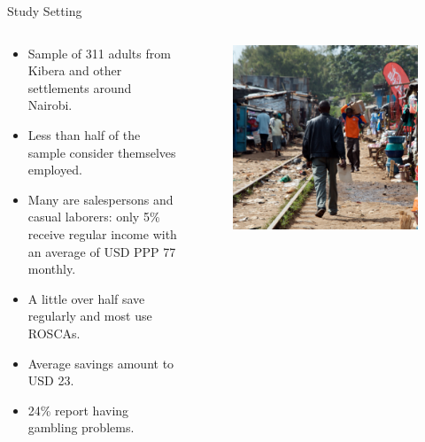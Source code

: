 \documentclass[aspectratio=169]{beamer}
\begin{document}
\begin{frame}{Study Setting}

	\begin{columns}

		\begin{column}{0.48\textwidth}

			\begin{itemize}
				\item Sample of 311 adults from Kibera and other settlements around Nairobi.
				\item Less than half of the sample consider themselves employed.
				\item Many are salespersons and casual laborers: only 5\% receive regular income with an average of USD PPP 77 monthly.
				\item A little over half save regularly and most use ROSCAs.
				\item Average savings amount to USD 23.
				\item 24\% report having gambling problems.
			\end{itemize}

		\end{column}

		\begin{column}{0.48\textwidth}

			\begin{figure}[H]
				\centering
				\includegraphics[height=0.8\textheight]{kibera-tracks-square.jpg}
			\end{figure}

		\end{column}

	\end{columns}



\end{frame}
\end{document}
